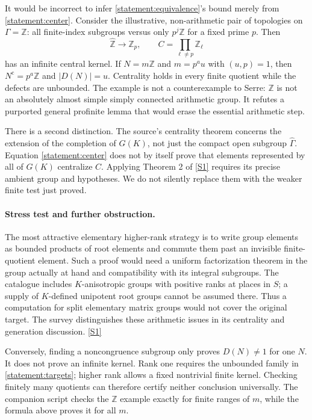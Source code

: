 \documentclass[11pt,a4paper]{article}
\newcommand{\Z}{\mathbb{Z}}
\newcommand{\sref}[2]{\hyperlink{source:#1:#2}{[S#2]}}
\numberwithin{equation}{section}
\begin{document}
It would be incorrect to infer \eqref{statement:equivalence}'s bound merely
from \eqref{statement:center}.  Consider the illustrative, non-arithmetic
pair of topologies on $\Gamma=\Z$: all finite-index subgroups versus only
$p^j\Z$ for a fixed prime $p$.  Then
\[
 \widehat{\Z}\longrightarrow\Z_p,
 \qquad C=\prod_{\ell\ne p}\Z_\ell
\]
has an infinite central kernel.  If $N=m\Z$ and
$m=p^a u$ with $(u,p)=1$, then $N^{\mathrm c}=p^a\Z$ and
$|D(N)|=u$.  Centrality holds in every finite quotient while the defects
are unbounded.  The example is not a counterexample to Serre: $\Z$ is
not an absolutely almost simple simply connected arithmetic group.
It refutes a purported general profinite lemma that would erase the
essential arithmetic step.

There is a second distinction.  The source's centrality theorem concerns
the extension of the completion of $G(K)$, not just the compact open
subgroup $\widehat\Gamma$.  Equation \eqref{statement:center} does not by itself
prove that elements represented by all of $G(K)$ centralize $C$.
Applying Theorem 2 of \sref{statement}{1} requires its precise ambient group
and hypotheses.  We do not silently replace them with the weaker
finite test just proved.

\paragraph{Stress test and further obstruction.}
The most attractive elementary higher-rank strategy is to write group
elements as bounded products of root elements and commute them past an
invisible finite-quotient element.  Such a proof would need a uniform
factorization theorem in the group actually at hand and compatibility
with its integral subgroups.  The catalogue includes $K$-anisotropic
groups with positive ranks at places in $S$; a supply of $K$-defined
unipotent root groups cannot be assumed there.  Thus a computation for
split elementary matrix groups would not cover the original target.
The survey distinguishes these arithmetic issues in its centrality
and generation discussion. \sref{statement}{1}

Conversely, finding a noncongruence subgroup only proves $D(N)\ne1$ for
one $N$.  It does not prove an infinite kernel.  Rank one requires the
unbounded family in \eqref{statement:targets}; higher rank allows a fixed
nontrivial finite kernel.  Checking finitely many quotients can therefore
certify neither conclusion universally.  The companion script checks
the $\Z$ example exactly for finite ranges of $m$, while the formula
above proves it for all $m$.
\end{document}

